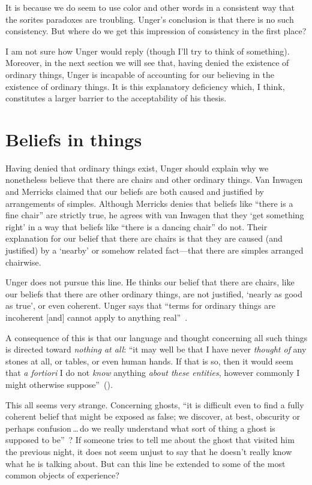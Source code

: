\documentclass[11pt]{standalone} \newif\ifstandlone \standalonetrue
\begin{document}
\begin{spacing}{1.5}
It is because we do seem to use color and other words in a consistent
way that the sorites paradoxes are troubling.  Unger's conclusion is
that there is no such consistency.  But where do we get this
impression of consistency in the first place?

I am not sure how Unger would reply (though I'll try to think of
something).  Moreover, in the next section we will see that, having
denied the existence of ordinary things, Unger is incapable of
accounting for our believing in the existence of ordinary things.  It
is this explanatory deficiency which, I think, constitutes a larger
barrier to the acceptability of his thesis.

\section{Beliefs in things}
\label{beliefs}
Having denied that ordinary things exist, Unger should explain why we
nonetheless believe that there are chairs and other ordinary things.
Van Inwagen and Merricks claimed that our beliefs are both caused and
justified by arrangements of simples.  Although Merricks denies that
beliefs like ``there is a fine chair'' are strictly true, he agrees with
van Inwagen that they `get something right' in a way that beliefs like
``there is a dancing chair'' do not.  Their explanation for our
belief that there are chairs is that they are caused (and justified)
by a `nearby' or somehow related fact---that there are simples
arranged chairwise.  

Unger does not pursue this line.  He thinks our belief that there are
chairs, like our beliefs that there are other ordinary things, are not
justified, `nearly as good as true', or even coherent.  Unger says
that ``terms for ordinary things are incoherent [and] cannot apply to
anything real''~\citep[147]{unger1979}.

A consequence of this is that our language and thought concerning all
such things is directed toward {\em nothing at all}: ``it may well be
that I have never {\em thought of} any stones at all, or tables, or
even human hands.  If that is so, then it would seem that {\em a
  fortiori} I do not {\em know} anything {\em about these entities},
however commonly I might otherwise
suppose''~(\citeyear[458]{unger1980a}).

This all seems very strange.  Concerning ghosts, ``it is difficult
even to find a fully coherent belief that might be exposed as false;
we discover, at best, obscurity or perhaps confusion\,\ldots\,do we
really understand what sort of thing a ghost is supposed to
be''~\citep[76]{stroud2000a}?  If someone tries to tell me about the
ghost that visited him the previous night, it does not seem unjust to
say that he doesn't really know what he is talking about.  But can
this line be extended to some of the most common objects of
experience?


\end{spacing}
\end{document}
